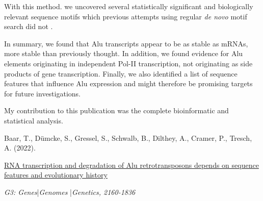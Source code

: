 With this method. we uncovered several statistically significant and
biologically relevant sequence motifs which previous attempts using regular
\textit{de novo} motif search did not \citep{Zhang2019}.
\bigbreak

\noindent In summary, we found that Alu transcripts appear to be as stable as
mRNAs, more stable than previously thought. In addition, we found evidence for
Alu elements originating in independent Pol-II transcription, not originating
as side products of gene transcription. Finally, we also identified a list of
sequence features that influence Alu expression and might therefore be
promising targets for future investigations.
\pagebreak


\null
\vfill
\noindent My contribution to this publication was the complete bioinformatic
and statistical analysis.\nopagebreak
\medskip
\begin{tcolorbox}[
  boxrule=0pt, leftrule=1pt, colframe=s-blue, colback=white, sharp corners=all]%
  \raggedright
  Baar, T., Dümcke, S., Gressel, S., Schwalb, B.,
  Dilthey, A., Cramer, P., Tresch, A. (2022).
  
  \smallskip
  \href{https://doi.org/10.1093/g3journal/jkac054}
    {RNA transcription and degradation of Alu retrotransposons depends on
    sequence features and evolutionary history}

  \smallskip
  \textit{G3: Genes}\thinspace{}|\thinspace{}\textit{Genomes}%
    \thinspace{}|\thinspace{}\textit{Genetics, 2160-1836}
\end{tcolorbox}


% 
% 

\newpage
\null
\thispagestyle{empty}

\null
\thispagestyle{empty}
\newpage